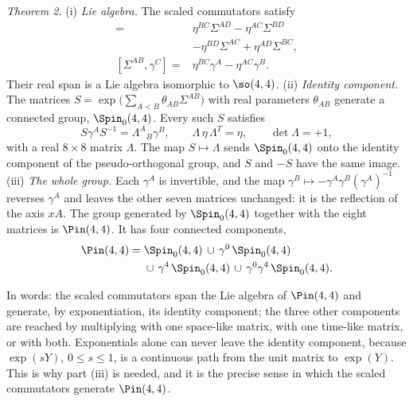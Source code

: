 \emph{Theorem 2.} (i) \emph{Lie algebra.} The scaled commutators satisfy
\begin{align}
[\Sigma^{AB},\Sigma^{CD}]={}&\eta^{BC}\Sigma^{AD}-\eta^{AC}\Sigma^{BD}\nonumber\\
&-\eta^{BD}\Sigma^{AC}+\eta^{AD}\Sigma^{BC},\label{eq:so44}\\
[\Sigma^{AB},\gamma^{C}]={}&\eta^{BC}\gamma^{A}-\eta^{AC}\gamma^{B}.\label{eq:vector}
\end{align}
Their real span is a Lie algebra isomorphic to $\so(4,4)$. (ii) \emph{Identity component.} The
matrices $S=\exp\big(\sum_{A<B}\theta_{AB}\Sigma^{AB}\big)$ with real parameters $\theta_{AB}$ generate
a connected group, $\Spin_0(4,4)$. Every such $S$ satisfies
\begin{equation}
S\gamma^AS^{-1}=\Lambda^A{}_B\gamma^B,\qquad\Lambda\,\eta\,\Lambda^T=\eta,\qquad\det\Lambda=+1,
\label{eq:lambda}
\end{equation}
with a real $8\times8$ matrix $\Lambda$. The map $S\mapsto\Lambda$ sends $\Spin_0(4,4)$ onto the
identity component of the pseudo-orthogonal group, and $S$ and $-S$ have the same image. (iii)
\emph{The whole group.} Each $\gamma^A$ is invertible, and the map
$\gamma^B\mapsto-\gamma^A\gamma^B(\gamma^A)^{-1}$ reverses $\gamma^A$ and leaves the other seven
matrices unchanged: it is the reflection of the axis $xA$. The group generated by $\Spin_0(4,4)$
together with the eight matrices is $\Pin(4,4)$. It has four connected components,
\begin{align}
\Pin(4,4)={}&\Spin_0(4,4)\,\cup\,\gamma^0\,\Spin_0(4,4)\nonumber\\
&\cup\,\gamma^4\,\Spin_0(4,4)\,\cup\,\gamma^0\gamma^4\,\Spin_0(4,4).
\label{eq:pin44}
\end{align}

In words: the scaled commutators span the Lie algebra of $\Pin(4,4)$ and generate, by exponentiation,
its identity component; the three other components are reached by multiplying with one space-like
matrix, with one time-like matrix, or with both. Exponentials alone can never leave the identity
component, because $\exp(sY)$, $0\le s\le1$, is a continuous path from the unit matrix to $\exp(Y)$.
This is why part (iii) is needed, and it is the precise sense in which the scaled commutators generate
$\Pin(4,4)$.

